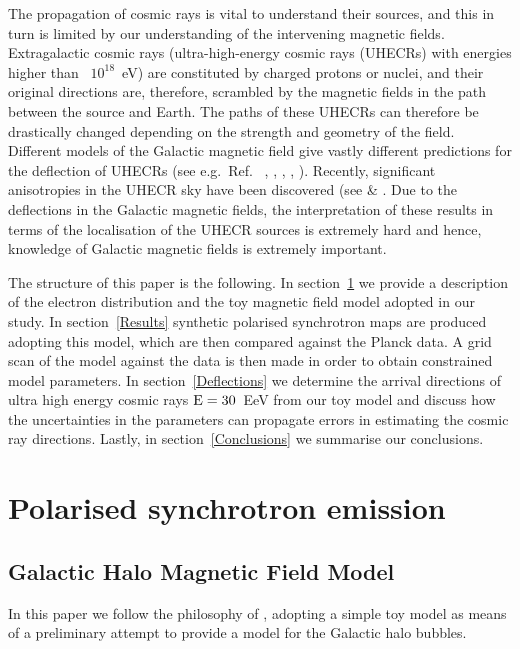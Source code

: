 \documentclass[usenatbib]{mnras}
\begin{document}
The propagation of cosmic rays is vital to understand their sources, and this in turn is limited by our understanding of the intervening magnetic fields. Extragalactic cosmic rays (ultra-high-energy cosmic rays (UHECRs) with energies higher than ~$10^{18}$~eV) are constituted by charged protons or nuclei, and their original directions are, therefore, scrambled by the magnetic fields in the path between the source and Earth. The paths of these UHECRs can therefore be drastically changed depending on the strength and geometry of the field. Different models of the Galactic magnetic field give vastly different predictions for the deflection of UHECRs (see e.g.~Ref.~ \cite{JF12}, \cite{FARRAR_2014}, \cite{PT11_2011}, \cite{Sun_2008}, \cite{Sun_2010}). Recently, significant anisotropies in the UHECR sky have been discovered (see \cite{TA_2014} \cite{ICRC_2021} \cite{Auger_Starburst2018} \& \cite{ICRC_2019}. Due to the deflections in the Galactic magnetic fields, the interpretation of these results in terms of the localisation of the UHECR sources is extremely hard and hence, knowledge of Galactic magnetic fields is extremely important. 
%


The structure of this paper is the following. In section~\ref{Methods} we provide a description of the electron distribution and the toy magnetic field model adopted in our study. In section~\ref{Results} synthetic polarised synchrotron maps are produced adopting this model, which are then compared against the Planck data. A grid scan of the model against the data is then made in order to obtain constrained model parameters. In section~\ref{Deflections} we determine the arrival directions of ultra high energy cosmic rays $\rm E = 30$~EeV from our toy model and discuss how the uncertainties in the parameters can propagate errors in estimating the cosmic ray directions. %
Lastly, in section~\ref{Conclusions} we summarise our conclusions.


\section{Polarised synchrotron emission}
\label{Methods}

\subsection{Galactic Halo Magnetic Field Model}
\label{GMF}
In this paper we follow the philosophy of \cite{West_Helicity}, adopting a simple toy model as means of a preliminary attempt to provide a model for the Galactic halo bubbles. 
\end{document}
